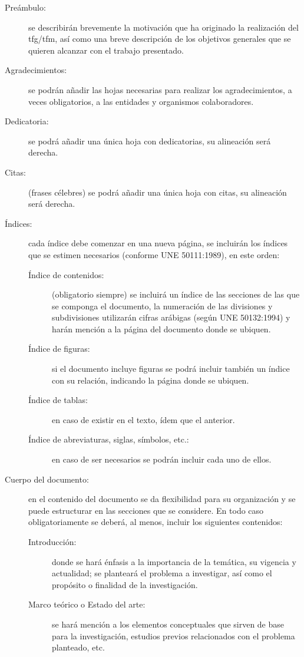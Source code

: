 \begin{description}
\item[Preámbulo:] se describirán brevemente la motivación que ha originado la realización del \gls{tfg}/\gls{tfm}, así como una breve descripción de los objetivos generales que se quieren alcanzar con el trabajo presentado.
\item[Agradecimientos:] se podrán añadir las hojas necesarias para realizar los agradecimientos, a veces obligatorios, a las entidades y organismos colaboradores.
\item[Dedicatoria:] se podrá añadir una única hoja con dedicatorias, su alineación será derecha.
\item[Citas:] (frases célebres) se podrá añadir una única hoja con citas, su alineación será derecha.
\item[Índices:] cada índice debe comenzar en una nueva página, se incluirán los índices que se estimen necesarios (conforme UNE 50111:1989), en este orden:
\begin{description}
\item[Índice de contenidos:] (obligatorio siempre) se incluirá un índice de las secciones de las que se componga el documento, la numeración de las 
divisiones y subdivisiones utilizarán cifras arábigas (según UNE 50132:1994) y harán mención a la página del documento donde se ubiquen.
\item[Índice de figuras:] si el documento incluye figuras se podrá incluir también un índice con su relación, indicando la página donde se ubiquen.
\item[Índice de tablas:] en caso de existir en el texto, ídem que el anterior.
\item[Índice de abreviaturas, siglas, símbolos, etc.:] en caso de ser necesarios se podrán incluir cada uno de ellos.
\end{description}
\item[Cuerpo del documento:] en el contenido del documento se da flexibilidad para su organización y se puede estructurar en las secciones que se considere. En todo caso obligatoriamente se deberá, al menos, incluir los siguientes contenidos:
\begin{description}
\item[Introducción:] donde se hará énfasis a la importancia de la temática, su vigencia y actualidad; se planteará el problema a investigar, así como el propósito o finalidad de la investigación.
\item[Marco teórico o Estado del arte:] se hará mención a los elementos conceptuales que sirven de base para la investigación, estudios previos relacionados con el problema planteado, etc.

\end{description}
\end{description}
